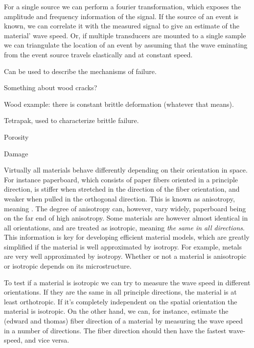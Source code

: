For a single source we can perform a fourier transformation, which exposes the amplitude and frequency information of the signal. If the source of an event is known, we can correlate it with the measured signal to give an estimate of the material' wave speed. Or, if multiple transducers are mounted to a single sample we can triangulate the location of an event by assuming that the wave eminating from the event source travels elastically and at constant speed. 

Can be used to describe the mechanisms of failure.

Something about wood cracks?

Wood example: there is constant brittle deformation (whatever that means).

Tetrapak, used to characterize brittle failure.

Porosity

Damage

Virtually all materials behave differently depending on their orientation in space. For instance paperboard, which consists of paper fibers oriented in a principle direction, is stiffer when stretched in the direction of the fiber orientation, and weaker when pulled in the orthogonal direction. This is known as anisotropy, meaning . The degree of anisotropy can, however, vary widely, paperboard being on the far end of high anisotropy. Some materials are however almost identical in all orientations, and are treated as isotropic, meaning \textit{the same in all directions}. This information is key for developing efficient material models, which are greatly simplified if the material is well approximated by isotropy. For example, metals are very well approximated by isotropy. Whether or not a material is anisotropic or isotropic depends on its microstructure.  

To test if a material is isotropic we can try to measure the wave speed in different orientations. If they are the same in all principle directions, the material is at least orthotropic. If it's completely independent on the spatial orientation the material is isotropic. On the other hand, we can, for instance, estimate the (edward and thomas) fiber direction of a material by measuring the wave speed in a number of directions. The fiber direction should then have the fastest wave-speed, and vice versa. 

